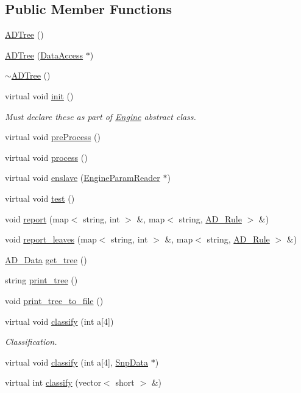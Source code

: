 \subsection*{Public Member Functions}
\begin{DoxyCompactItemize}
\item 
\hyperlink{classADTree_a4cc267cd53158a78c5812416b15477c6}{ADTree} ()
\item 
\hyperlink{classADTree_ae5069f6f5e8fc92a8fa8f687d0c6e911}{ADTree} (\hyperlink{classDataAccess}{DataAccess} $\ast$)
\item 
\hyperlink{classADTree_a42f89fabb90e742c8609af4618fc5fb7}{$\sim$ADTree} ()
\item 
virtual void \hyperlink{classADTree_a70b34e300c187fb817bc6d8ba31aceaa}{init} ()
\begin{DoxyCompactList}\small\item\em Must declare these as part of \hyperlink{classEngine}{Engine} abstract class. \item\end{DoxyCompactList}\item 
virtual void \hyperlink{classADTree_a18b7ad4befedb9073a83c39106628d3b}{preProcess} ()
\item 
virtual void \hyperlink{classADTree_acbdd5c7a248305933868e00bd875fd33}{process} ()
\item 
virtual void \hyperlink{classADTree_a4e89d611e7dc79fa8826efa742f9ce42}{enslave} (\hyperlink{classEngineParamReader}{EngineParamReader} $\ast$)
\item 
virtual void \hyperlink{classADTree_ac4183a7e36602b90e36e3717deef102c}{test} ()
\item 
void \hyperlink{classADTree_a544f723a8c49a74f554fb04d3a78cea6}{report} (map$<$ string, int $>$ \&, map$<$ string, \hyperlink{classAD__Rule}{AD\_\-Rule} $>$ \&)
\item 
void \hyperlink{classADTree_ab1fb3de26e2af354385c44eba2d17a98}{report\_\-leaves} (map$<$ string, int $>$ \&, map$<$ string, \hyperlink{classAD__Rule}{AD\_\-Rule} $>$ \&)
\item 
\hyperlink{classAD__Data}{AD\_\-Data} \hyperlink{classADTree_acd4ffcfe3f27fff312b143689b7add52}{get\_\-tree} ()
\item 
string \hyperlink{classADTree_a9b3d523c53bbfffe1988d72fb9791c87}{print\_\-tree} ()
\item 
void \hyperlink{classADTree_abb780d1ef5e6d66128dc990ce0189554}{print\_\-tree\_\-to\_\-file} ()
\item 
virtual void \hyperlink{classADTree_a335cdf83f845638ae6c74fa1d7e7e4b8}{classify} (int a\mbox{[}4\mbox{]})
\begin{DoxyCompactList}\small\item\em Classification. \item\end{DoxyCompactList}\item 
virtual void \hyperlink{classADTree_a498b7a7830dba60118e89d5f5bb7cbd3}{classify} (int a\mbox{[}4\mbox{]}, \hyperlink{classSnpData}{SnpData} $\ast$)
\item 
virtual int \hyperlink{classADTree_a266a816ec8750b5ceb1549ff610fb67b}{classify} (vector$<$ short $>$ \&)
\end{DoxyCompactItemize}
